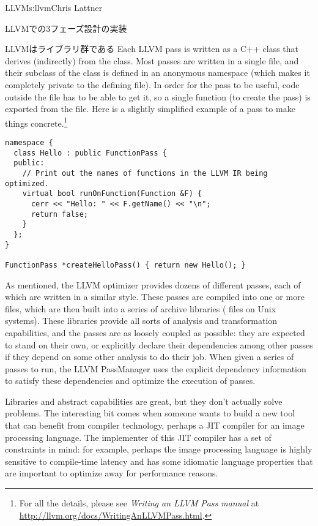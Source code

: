 \begin{aosachapter}{LLVM}{s:llvm}{Chris Lattner}
\begin{aosasect1}{LLVMでの3フェーズ設計の実装}
\begin{aosasect2}{LLVMはライブラリ群である}
Each LLVM pass is written as a C++ class that derives (indirectly)
from the  class.  Most passes are written in a single
 file, and their subclass of the  class is
defined in an anonymous namespace (which makes it completely private
to the defining file).  In order for the pass to be useful, code
outside the file has to be able to get it, so a single function (to
create the pass) is exported from the file.  Here is a slightly
simplified example of a pass to make things concrete.\footnote{ For
all the details, please see \emph{Writing an LLVM Pass manual} at
\url{http://llvm.org/docs/WritingAnLLVMPass.html}.  }

\begin{verbatim}
namespace {
  class Hello : public FunctionPass {
  public:
    // Print out the names of functions in the LLVM IR being optimized.
    virtual bool runOnFunction(Function &F) {
      cerr << "Hello: " << F.getName() << "\n";
      return false;
    }
  };
}

FunctionPass *createHelloPass() { return new Hello(); }
\end{verbatim}

As mentioned, the LLVM optimizer provides dozens of different passes,
each of which are written in a similar style.  These passes are
compiled into one or more  files, which are then built into a
series of archive libraries ( files on Unix systems). These
libraries provide all sorts of analysis and transformation
capabilities, and the passes are as loosely coupled as possible: they
are expected to stand on their own, or explicitly declare their
dependencies among other passes if they depend on some other analysis
to do their job.  When given a series of passes to run, the LLVM
PassManager uses the explicit dependency information to satisfy these
dependencies and optimize the execution of passes.

Libraries and abstract capabilities are great, but they don't actually
solve problems.  The interesting bit comes when someone wants to build
a new tool that can benefit from compiler technology, perhaps a JIT
compiler for an image processing language.  The implementer of this
JIT compiler has a set of constraints in mind: for example, perhaps
the image processing language is highly sensitive to compile-time
latency and has some idiomatic language properties that are important
to optimize away for performance reasons.


\end{aosasect2}
\end{aosasect1}
\end{aosachapter}
